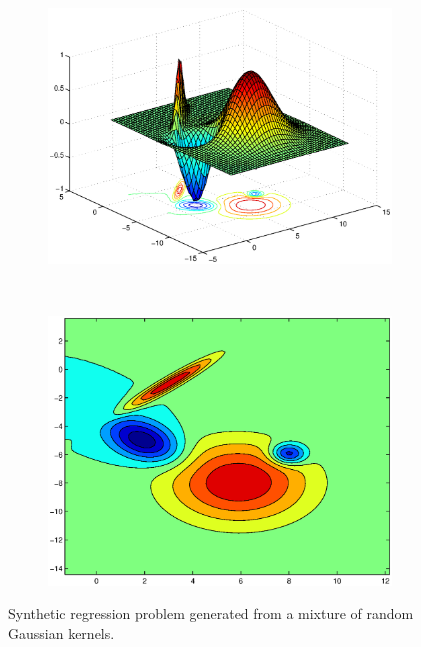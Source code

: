 \documentclass[useAMS,usenatbib,fleqn]{mn2e}
\begin{document}
\begin{figure}
        \centering
        \begin{subfigure}[b]{0.45\columnwidth}
                \includegraphics[width=\textwidth]{figures/surface.eps}
        \end{subfigure}
        ~
         \begin{subfigure}[b]{0.45\columnwidth}
                \includegraphics[width=\textwidth]{figures/contour.eps}
        \end{subfigure}
                       
        \caption{Synthetic regression problem generated from a mixture of random Gaussian kernels. }
       \label{fig-toy-example}
\end{figure}
\end{document}
